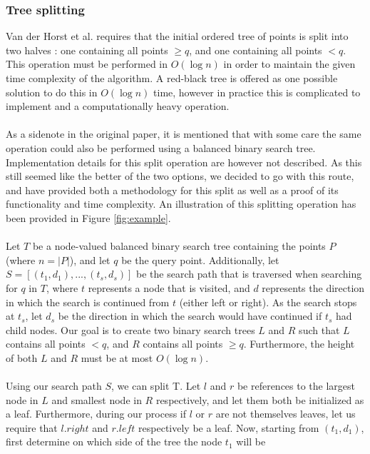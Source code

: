 \documentclass{article}
\newcommand{\fb}[1]{{\color{blue}#1}}
\begin{document}
\subsubsection{Tree splitting}
Van der Horst et al. requires that the initial ordered tree of points is split
into two halves \cite{vanderhorst_et_al:LIPIcs.ESA.2022.67}: one containing all
points $\geq q$, and one containing all points $< q$. This operation must be
performed in $O(\log n)$ in order to maintain the given time complexity of the
algorithm. A red-black tree is offered as one possible solution to do this in
$O(\log n)$ time, however in practice this is complicated to implement and a
computationally heavy operation.\\\\ As a sidenote in the original paper, it is
mentioned that with some care the same operation could also be performed using
a balanced binary search tree. Implementation details for this split operation
are however not described. As this still seemed like the better of the two
options, we decided to go with this route, and have provided both a methodology
for this split as well as a proof of its functionality and time complexity. An
illustration of this splitting operation has been provided in Figure
\ref{fig:example}. \\\\ Let $T$ be a node-valued balanced binary search tree
containing the points $P$ (where $n = |P|$), and let $q$ be the query point.
Additionally, let $S = [(t_1, d_1), ..., (t_s, d_s)]$ be the search path that
is traversed when searching for $q$ in $T$, where $t$ represents a node that is
visited, and $d$ represents the direction in which the search is continued from
$t$ (either left or right). As the search stops at $t_s$, let $d_s$ be the
direction in which the search would have continued if $t_s$ had child nodes.
Our goal is to create two binary search trees $L$ and $R$ such that $L$
contains all points $<q$, and $R$ contains all points $\geq q$. Furthermore,
the height of both $L$ and $R$ must be at most $O(\log n)$. \\\\ Using our
search path $S$, we can split T. Let $l$ and $r$ be references to the largest
node in $L$ and smallest node in $R$ respectively, and let them both be
initialized as a leaf. Furthermore, during \fb{our} process if $l$ or $r$ are not
\fb{themselves} leaves, let \fb{us require that} $l.right$ and $r.left$ respectively be a leaf. Now, starting from
$(t_1, d_1)$, first determine on which side of the tree the node $t_1$ will be
\end{document}
